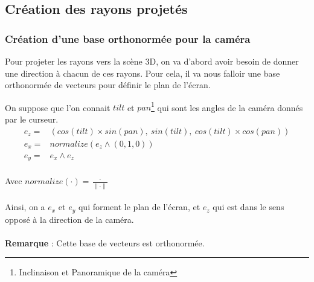 \newpage
\subsection{Création des rayons projetés}
\subsubsection{Création d'une base orthonormée pour la caméra}
Pour projeter les rayons vers la scène 3D, on va d'abord avoir besoin de donner une direction à chacun de ces rayons. Pour cela, il va nous falloir une base orthonormée de vecteurs pour définir le plan de l'écran.
\par
\noindent 
On suppose que l'on connait $tilt$ et $pan$\footnote[2]{Inclinaison et Panoramique de la caméra} qui sont les angles de la caméra donnés par le curseur. 
\begin{align*}
    e_z =&  (cos(tilt)\times sin(pan) ,\ sin(tilt) ,\ cos(tilt)\times cos(pan))\\
    e_x =&  normalize(e_z \wedge (0,1,0) )\\
    e_y =& e_x \wedge e_z\\
\end{align*}

Avec $normalize(\cdot ) = \frac{\cdot }{\| \cdot  \|}$\\ \\  
Ainsi, on a $e_x$ et $e_y$ qui forment le plan de l'écran, et $e_z$ qui est dans le sens opposé à la direction de la caméra.\\ \\ 
\textbf{Remarque} : Cette base de vecteurs est orthonormée.


